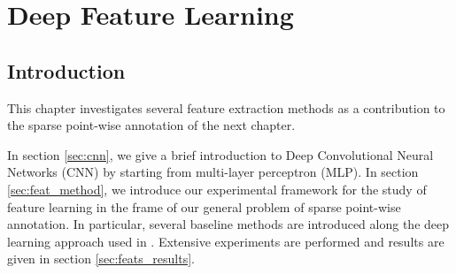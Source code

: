 \chapter{Deep Feature Learning}

\section{Introduction}

This chapter investigates several feature extraction methods as a contribution to the sparse point-wise annotation of the next chapter.

In section \ref{sec:cnn}, we give a brief introduction to Deep Convolutional Neural Networks (CNN) by starting from multi-layer perceptron (MLP).
In section \ref{sec:feat_method}, we introduce our experimental framework for the study of feature learning in the frame of our general problem of sparse point-wise annotation.
In particular, several baseline methods are introduced along the deep learning approach used in \cite{lejeune18}.
Extensive experiments are performed and results are given in section \ref{sec:feats_results}.


\endinput

